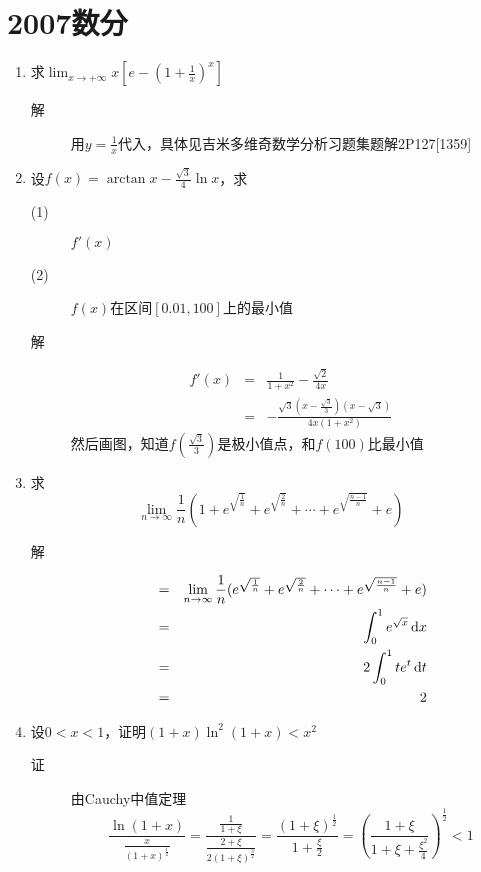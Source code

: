 \section{2007数分}
\begin{enumerate}
\item 求$\lim_{x \to +\infty}x[e-(1+\frac{1}{x})^x]$
\begin{description}
\item[解] 用$y=\frac{1}{x}$代入，具体见吉米多维奇数学分析习题集题解2P127[1359]
\end{description}

\item 设$f(x)=\arctan x -\frac{\sqrt{3}}{4}\ln x$，求
\begin{description}
\item[(1)] $f'(x)$
\item[(2)] $f(x)$在区间$[0.01,100]$上的最小值
\item[解]
\begin{eqnarray*}
f'(x) & = & \frac{1}{1+x^2}-\frac{\sqrt{2}}{4x}\\
& = & - \frac{\sqrt{3}(x-\frac{\sqrt{3}}{3})(x-\sqrt{3})}{4x(1+x^2)}
\end{eqnarray*}
然后画图，知道$f(\frac{\sqrt{3}}{3})$是极小值点，和$f(100)$比最小值
\end{description}

\item 求
\[
\lim_{n \to \infty}\frac{1}{n}(1+e^{\sqrt{\frac{1}{n}}}+e^{\sqrt{\frac{2}{n}}}+\cdots +e^{\sqrt{\frac{n-1}{n}}} +e)
\]
\begin{description}
\item[解]
\begin{eqnarray*}
& = & \lim_{n \to \infty}\frac{1}{n}(e^{\sqrt{\frac{1}{n}}}+e^{\sqrt{\frac{2}{n}}}+\cdots +e^{\sqrt{\frac{n-1}{n}}} +e)\\
& = & \int_0^1 e^{\sqrt{x}}\,\mathrm{d} x \\
& = & 2 \int_0^1 te^t \,\mathrm{d} t \\
& = & 2
\end{eqnarray*}
\end{description}


\item 设$0<x<1$，证明$(1+x)\ln^2(1+x)<x^2$
\begin{description}
\item[证] 由Cauchy中值定理
\[
\frac{\ln(1+x)}{\frac{x}{(1+x)^\frac{1}{2}}}=\frac{\frac{1}{1+\xi}}{\frac{2+\xi}{2(1+\xi)^{\frac{3}{2}}}} = \frac{(1+\xi)^\frac{1}{2}}{1+\frac{\xi}{2}} = \left( \frac{1+\xi}{1+\xi+\frac{\xi^2}{4}}\right)^{\frac{1}{2}} < 1
\]
\end{description}


\end{enumerate}

